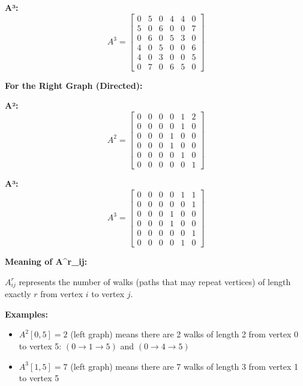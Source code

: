 \documentclass[12pt,a4paper]{article}
\begin{document}
\textbf{A³:}
\begin{equation}
A^3 = \begin{bmatrix}
0 & 5 & 0 & 4 & 4 & 0 \\
5 & 0 & 6 & 0 & 0 & 7 \\
0 & 6 & 0 & 5 & 3 & 0 \\
4 & 0 & 5 & 0 & 0 & 6 \\
4 & 0 & 3 & 0 & 0 & 5 \\
0 & 7 & 0 & 6 & 5 & 0
\end{bmatrix}
\end{equation}

\textbf{For the Right Graph (Directed):}

\textbf{A²:}
\begin{equation}
A^2 = \begin{bmatrix}
0 & 0 & 0 & 0 & 1 & 2 \\
0 & 0 & 0 & 0 & 1 & 0 \\
0 & 0 & 0 & 1 & 0 & 0 \\
0 & 0 & 0 & 1 & 0 & 0 \\
0 & 0 & 0 & 0 & 1 & 0 \\
0 & 0 & 0 & 0 & 0 & 1
\end{bmatrix}
\end{equation}

\textbf{A³:}
\begin{equation}
A^3 = \begin{bmatrix}
0 & 0 & 0 & 0 & 1 & 1 \\
0 & 0 & 0 & 0 & 0 & 1 \\
0 & 0 & 0 & 1 & 0 & 0 \\
0 & 0 & 0 & 1 & 0 & 0 \\
0 & 0 & 0 & 0 & 0 & 1 \\
0 & 0 & 0 & 0 & 1 & 0
\end{bmatrix}
\end{equation}

\textbf{Meaning of A^r_ij:}

$A^r_{ij}$ represents the number of walks (paths that may repeat vertices) of length exactly $r$ from vertex $i$ to vertex $j$.

\textbf{Examples:}
\begin{itemize}
    \item $A^2[0,5] = 2$ (left graph) means there are 2 walks of length 2 from vertex 0 to vertex 5: $(0 \rightarrow 1 \rightarrow 5)$ and $(0 \rightarrow 4 \rightarrow 5)$
    \item $A^3[1,5] = 7$ (left graph) means there are 7 walks of length 3 from vertex 1 to vertex 5
\end{itemize}
\end{document}
